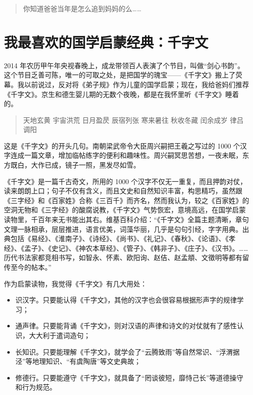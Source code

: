 \documentclass[twoside,openright,headings=optiontohead]{ctexbook} %
\begin{document}
{\begin{quote}
你知道爸爸当年是怎么追到妈妈的么\ldots{}\ldots{}
\end{quote}

\chapter*{我最喜欢的国学启蒙经典：千字文}\label{thousand}

2014
年农历甲午年央视春晚上，成龙带领百人表演了个节目，叫做``剑心书韵''。这个节目乏善可陈，唯一的可取之处，是把国学的瑰宝------《千字文》搬上了荧幕。我以前说过，反对将《弟子规》作为儿童的国学启蒙；现在，我给爸妈们推荐《千字文》。京生和德生婴儿期的无数个夜晚，都是在我怀里听《千字文》睡着的。

\begin{quote}
天地玄黄 宇宙洪荒 日月盈昃 辰宿列张 寒来暑往 秋收冬藏 闰余成岁 律吕调阳
\end{quote}

这是《千字文》的开头几句。南朝梁武帝令大臣周兴嗣把王羲之写过的 1000
个汉字连成一篇文章，增加临帖练字的便利和趣味性。周兴嗣冥思苦想，一夜未眠，东方既白，大作已成，镜子一照，黑发尽如雪。

《千字文》是一篇千古奇文，所用的 1000
个汉字不仅无一重复，而且押韵对仗，读来朗朗上口；句子不仅有含义，而且文史和自然知识丰富，构思精巧，虽然跟《三字经》和《百家姓》合称《三百千》而齐名，然而我认为，较之《百家姓》的空洞无物和《三字经》的酸腐说教，《千字文》气势恢宏，意境高远，在国学启蒙读物里，千百年来无书能出其右。维基百科介绍：``《千字文》全篇主题清晰，章句文理一脉相承，层层推进，语言优美，词藻华丽，几乎是句句引经，字字用典。出典包括《易经》、《淮南子》、《诗经》、《尚书》、《礼记》、《春秋》、《论语》、《孝经》、《孟子》、《史记》、《神农本草经》、《管子》、《韩非子》、《庄子》、《汉书》。\ldots{}\ldots{}历代书法家都竞相书写，如智永、怀素、欧阳询、赵佶、赵孟頫、文徵明等都有留传至今的帖本。''

作为启蒙读物，我觉得《千字文》有几大用处：

\begin{itemize}
\item
  识汉字。只要能认得《千字文》，其他的汉字也会很容易根据形声字的规律学习；
\item
  通声律。只要能背诵《千字文》，则对汉语的声律和诗文的对仗就有了感性认识，大大利于遣词造句；
\item
  长知识。只要能理解《千字文》，就学会了``云腾致雨''等自然常识、``浮渭据泾''等地理知识、``有虞陶唐''等文史典故；
\item
  修德行。只要能遵守《千字文》，就具备了``罔谈彼短，靡恃己长''等道德操守和行为规范。
\end{itemize}

}
\end{document}
